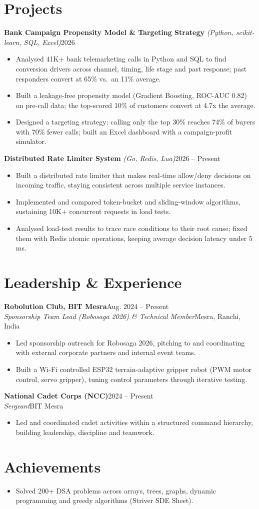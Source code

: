 \documentclass[a4paper,11pt]{article}
\newcommand{\entry}[4]{\textbf{#1}\hfill #2\\\textit{#3}\hfill {\small #4}\vspace{-2pt}}
\begin{document}
\section{Projects}
\textbf{Bank Campaign Propensity Model \& Targeting Strategy} \textit{(Python, scikit-learn, SQL, Excel)}\hfill 2026
\begin{itemize}
\item Analysed 41K+ bank telemarketing calls in Python and SQL to find conversion drivers across channel, timing, life stage and past response; past responders convert at 65\% vs.\ an 11\% average.
\item Built a leakage-free propensity model (Gradient Boosting, ROC-AUC 0.82) on pre-call data; the top-scored 10\% of customers convert at 4.7x the average.
\item Designed a targeting strategy: calling only the top 30\% reaches 74\% of buyers with 70\% fewer calls; built an Excel dashboard with a campaign-profit simulator.
\end{itemize}
\textbf{Distributed Rate Limiter System} \textit{(Go, Redis, Lua)}\hfill 2026 -- Present
\begin{itemize}
\item Built a distributed rate limiter that makes real-time allow/deny decisions on incoming traffic, staying consistent across multiple service instances.
\item Implemented and compared token-bucket and sliding-window algorithms, sustaining 10K+ concurrent requests in load tests.
\item Analysed load-test results to trace race conditions to their root cause; fixed them with Redis atomic operations, keeping average decision latency under 5\,ms.
\end{itemize}

\section{Leadership \& Experience}
\entry{Robolution Club, BIT Mesra}{Aug. 2024 -- Present}{Sponsorship Team Lead (Robosaga 2026) \& Technical Member}{Mesra, Ranchi, India}
\begin{itemize}
\item Led sponsorship outreach for Robosaga 2026, pitching to and coordinating with external corporate partners and internal event teams.
\item Built a Wi-Fi controlled ESP32 terrain-adaptive gripper robot (PWM motor control, servo gripper), tuning control parameters through iterative testing.
\end{itemize}
\entry{National Cadet Corps (NCC)}{2024 -- Present}{Sergeant}{BIT Mesra}
\begin{itemize}
\item Led and coordinated cadet activities within a structured command hierarchy, building leadership, discipline and teamwork.
\end{itemize}

\section{Achievements}
\begin{itemize}[label=\textbullet]
\item Solved 200+ DSA problems across arrays, trees, graphs, dynamic programming and greedy algorithms (Striver SDE Sheet).
\end{itemize}
\end{document}
